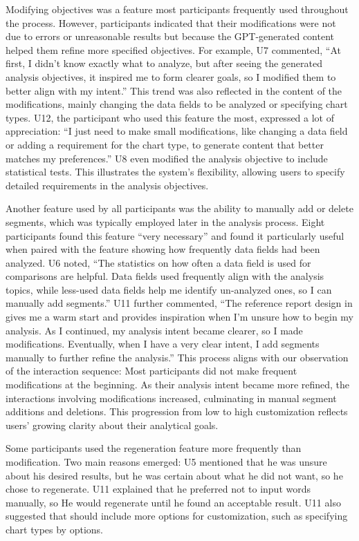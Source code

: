 Modifying objectives was a feature most participants frequently used throughout the process.
However, participants indicated that their modifications were not due to errors or unreasonable results but because the GPT-generated content helped them refine more specified objectives.
For example, U7 commented, ``At first, I didn't know exactly what to analyze, but after seeing the generated analysis objectives, it inspired me to form clearer goals, so I modified them to better align with my intent.''
This trend was also reflected in the content of the modifications, mainly changing the data fields to be analyzed or specifying chart types.
U12, the participant who used this feature the most, expressed a lot of appreciation: ``I just need to make small modifications, like changing a data field or adding a requirement for the chart type, to generate content that better matches my preferences.''
U8 even modified the analysis objective to include statistical tests.
This illustrates the system's flexibility, allowing users to specify detailed requirements in the analysis objectives.

Another feature used by all participants was the ability to manually add or delete segments, which was typically employed later in the analysis process.
Eight participants found this feature ``very necessary'' and found it particularly useful when paired with the feature showing how frequently data fields had been analyzed.
U6 noted, ``The statistics on how often a data field is used for comparisons are helpful. Data fields used frequently align with the analysis topics, while less-used data fields help me identify un-analyzed ones, so I can manually add segments.''
U11 further commented, ``The reference report design in \system{} gives me a warm start and provides inspiration when I'm unsure how to begin my analysis. As I continued, my analysis intent became clearer, so I made modifications. Eventually, when I have a very clear intent, I add segments manually to further refine the analysis.''
This process aligns with our observation of the interaction sequence: Most participants did not make frequent modifications at the beginning.
As their analysis intent became more refined, the interactions involving modifications increased, culminating in manual segment additions and deletions.
This progression from low to high customization reflects users' growing clarity about their analytical goals.

Some participants used the regeneration feature more frequently than modification. 
Two main reasons emerged:
U5 mentioned that he was unsure about his desired results, but he was certain about what he did not want, so he chose to regenerate.
U11 explained that he preferred not to input words manually, so He would regenerate until he found an acceptable result. 
U11 also suggested that \system{} should include more options for customization, such as specifying chart types by options.